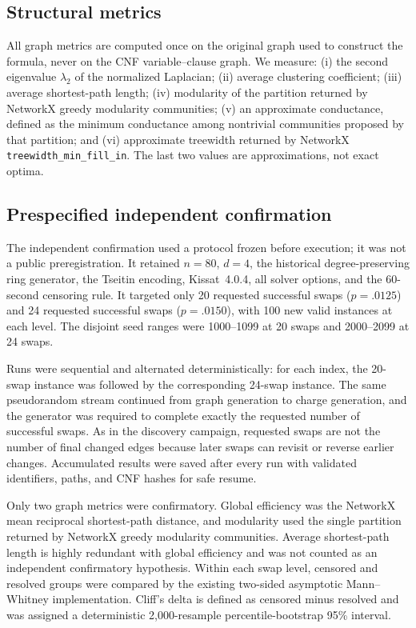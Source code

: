 \documentclass[11pt]{article}
\begin{document}
\subsection{Structural metrics}

All graph metrics are computed once on the original graph used to construct the formula, never on the CNF variable--clause graph. We measure: (i) the second eigenvalue $\lambda_2$ of the normalized Laplacian; (ii) average clustering coefficient; (iii) average shortest-path length; (iv) modularity of the partition returned by NetworkX greedy modularity communities; (v) an approximate conductance, defined as the minimum conductance among nontrivial communities proposed by that partition; and (vi) approximate treewidth returned by NetworkX \texttt{treewidth\_min\_fill\_in}. The last two values are approximations, not exact optima.

\subsection{Prespecified independent confirmation}

The independent confirmation used a protocol frozen before execution; it was not a public preregistration. It retained $n=80$, $d=4$, the historical degree-preserving ring generator, the Tseitin encoding, Kissat~4.0.4, all solver options, and the 60-second censoring rule. It targeted only 20 requested successful swaps ($p=.0125$) and 24 requested successful swaps ($p=.0150$), with 100 new valid instances at each level. The disjoint seed ranges were 1000--1099 at 20 swaps and 2000--2099 at 24 swaps.

Runs were sequential and alternated deterministically: for each index, the 20-swap instance was followed by the corresponding 24-swap instance. The same pseudorandom stream continued from graph generation to charge generation, and the generator was required to complete exactly the requested number of successful swaps. As in the discovery campaign, requested swaps are not the number of final changed edges because later swaps can revisit or reverse earlier changes. Accumulated results were saved after every run with validated identifiers, paths, and CNF hashes for safe resume.

Only two graph metrics were confirmatory. Global efficiency was the NetworkX mean reciprocal shortest-path distance, and modularity used the single partition returned by NetworkX greedy modularity communities. Average shortest-path length is highly redundant with global efficiency and was not counted as an independent confirmatory hypothesis. Within each swap level, censored and resolved groups were compared by the existing two-sided asymptotic Mann--Whitney implementation. Cliff's delta is defined as censored minus resolved and was assigned a deterministic 2,000-resample percentile-bootstrap 95\% interval.
\end{document}
